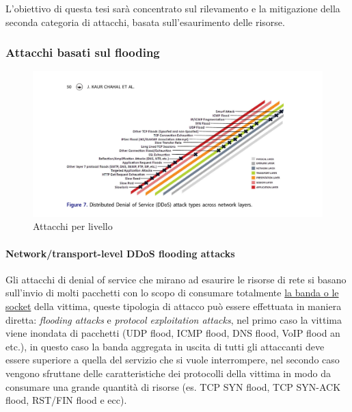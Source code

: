 L'obiettivo di questa tesi sarà concentrato sul rilevamento e la mitigazione della seconda categoria di attacchi, basata sull'esaurimento delle risorse.

\subsubsection{Attacchi basati sul flooding}

\begin{figure}[h]
    \includegraphics[width=\hsize]{images/introduzione/attacchi_per_livello.png}
    \caption{Attacchi per livello \cite{ddos_survey_4}}
    \centering
\end{figure}

\paragraph{Network/transport-level DDoS flooding attacks} %
Gli attacchi di denial of service che mirano ad esaurire le risorse di rete si basano sull'invio di molti pacchetti con lo scopo di consumare totalmente \uline{la banda o le socket} della vittima, queste tipologia di attacco può essere effettuata in maniera diretta: \emph{flooding attacks} e \emph{protocol exploitation attacks}, nel primo caso la vittima viene inondata di pacchetti (UDP flood, ICMP flood, DNS flood, VoIP flood an etc.), in questo caso la banda aggregata in uscita di tutti gli attaccanti deve essere superiore a quella del servizio che si vuole interrompere, nel secondo caso vengono sfruttane delle caratteristiche dei protocolli della vittima in modo da consumare una grande quantità di risorse (es. TCP SYN flood, TCP SYN-ACK flood, RST/FIN flood e ecc).

